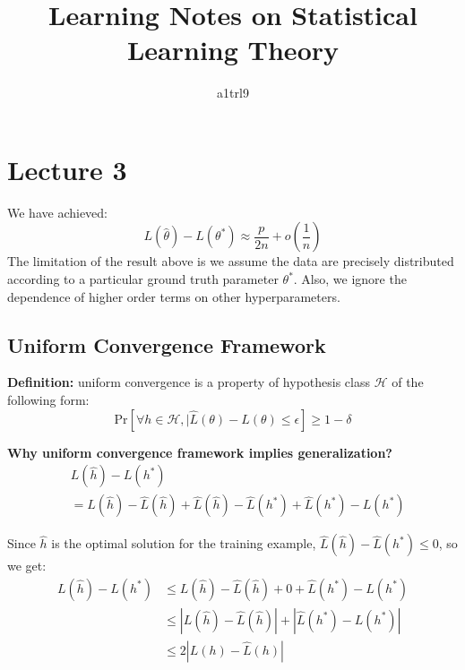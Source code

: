 \documentclass{article}
\title{Learning Notes on Statistical Learning Theory}
\author{a1trl9}
\date{}
\begin{document}
\maketitle
\section{Lecture 3}
We have achieved:
\begin{equation}
    L(\hat{\theta})-L(\theta^{*}) \approx \frac{p}{2n} + o(\frac{1}{n})
\end{equation}
The limitation of the result above is we assume the data are precisely
distributed according to a particular ground truth parameter \(\theta^{*}\).
Also, we ignore the dependence of higher order terms on other hyperparameters.

\subsection{Uniform Convergence Framework}

\textbf{Definition:} uniform convergence is a property of hypothesis
class \(\mathcal{H}\) of the following form:
\begin{equation}
\mathrm{Pr}[\forall h \in \mathcal{H}, | \hat{L}(\theta)-L(\theta)\leq \epsilon] \geq 1 - \delta
\end{equation}

\textbf{Why uniform convergence framework implies generalization?}
\vspace{2mm}
\begin{equation}
\begin{aligned}
&L(\hat{h})-L(h^{*})\\
&=L(\hat{h}) - \hat{L}(\hat{h})+\hat{L}(\hat{h})-\hat{L}(h^{*})+\hat{L}(h^{*})-L(h^{*})
\end{aligned}
\end{equation}

Since \(\hat{h}\) is the optimal solution for the training example, \(\hat{L}(\hat{h})-\hat{L}(h^{*})\leq 0\), so
we get:
\begin{equation}
\begin{aligned}
L(\hat{h})-L(h^{*})&\leq L(\hat{h}) - \hat{L}(\hat{h})+0+\hat{L}(h^{*})-L(h^{*})\\
&\leq |L(\hat{h})-\hat{L}(\hat{h})| + |\hat{L}(h^*)-L(h^*)|\\
&\leq 2|L({h})-\hat{L}(h)|
\end{aligned}
\end{equation}
\end{document}
